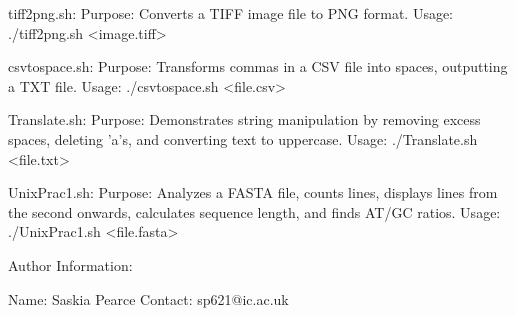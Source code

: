 tiff2png.sh:
    Purpose: Converts a TIFF image file to PNG format.
    Usage: ./tiff2png.sh <image.tiff>

csvtospace.sh:
    Purpose: Transforms commas in a CSV file into spaces, outputting a TXT file.
    Usage: ./csvtospace.sh <file.csv>

Translate.sh:
    Purpose: Demonstrates string manipulation by removing excess spaces, deleting 'a's, and converting text to uppercase.
    Usage: ./Translate.sh <file.txt>

UnixPrac1.sh:
    Purpose: Analyzes a FASTA file, counts lines, displays lines from the second onwards, calculates sequence length, and finds AT/GC ratios.
    Usage: ./UnixPrac1.sh <file.fasta>

Author Information:

Name: Saskia Pearce
Contact: sp621@ic.ac.uk
